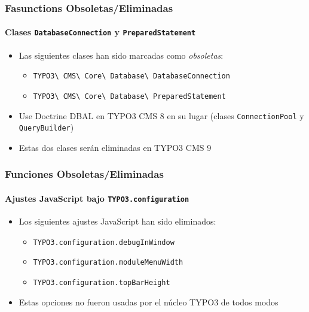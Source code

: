 \begin{frame}[fragile]
	\frametitle{Fasunctions Obsoletas/Eliminadas}
	\framesubtitle{Clases \texttt{DatabaseConnection} y \texttt{PreparedStatement}}

	\begin{itemize}
		\item Las siguientes clases han sido marcadas como \textit{obsoletas}:
			\begin{itemize}
				\item \texttt{TYPO3\textbackslash
						CMS\textbackslash
						Core\textbackslash
						Database\textbackslash
						DatabaseConnection}
				\item \texttt{TYPO3\textbackslash
						CMS\textbackslash
						Core\textbackslash
						Database\textbackslash
						PreparedStatement}
			\end{itemize}
		\item Use Doctrine DBAL en TYPO3 CMS 8 en su lugar\newline
				(clases \texttt{ConnectionPool} y \texttt{QueryBuilder})
		\item Estas dos clases serán eliminadas en TYPO3 CMS 9
	\end{itemize}

\end{frame}


\begin{frame}[fragile]
	\frametitle{Funciones Obsoletas/Eliminadas}
	\framesubtitle{Ajustes JavaScript bajo \texttt{TYPO3.configuration}}

	\begin{itemize}
		\item Los siguientes ajustes JavaScript han sido eliminados:

		\begin{itemize}
			\item \texttt{TYPO3.configuration.debugInWindow}
			\item \texttt{TYPO3.configuration.moduleMenuWidth}
			\item \texttt{TYPO3.configuration.topBarHeight}
		\end{itemize}

		\item Estas opciones no fueron usadas por el núcleo TYPO3 de todos modos

	\end{itemize}

\end{frame}


